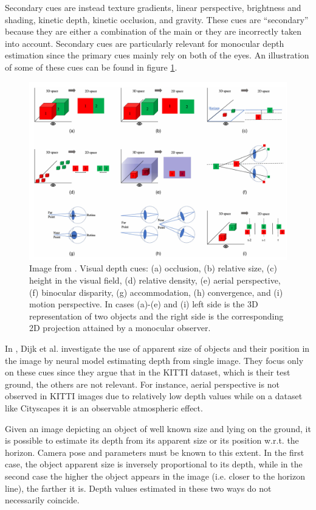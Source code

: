 Secondary cues are instead texture gradients, linear perspective, brightness and shading, kinetic depth, kinetic occlusion, and gravity.
These cues are “secondary” because they are either a combination of the main or they are incorrectly taken into account.
Secondary cues are particularly relevant for monocular depth estimation since the primary cues mainly rely on both of the eyes.
An illustration of some of these cues can be found in figure \ref{fig:cues}.

\begin{figure}
    \centering
    \includegraphics[width=1.\textwidth]{figs/cues}
    \caption{
        Image from \cite{monocular2024}. Visual depth cues: (a) occlusion, (b) relative size, (c) height in the visual field, (d) relative density, (e) aerial perspective, (f) binocular disparity, (g) accommodation, (h) convergence, and (i) motion perspective.
        In cases (a)-(e) and (i) left side is the 3D representation of two objects and the right side is the corresponding 2D projection attained by a monocular observer.
        \label{fig:cues}
    }
\end{figure}

In \cite{Dijk}, Dijk et al. investigate the use of apparent size of objects and their position in the image by neural model estimating depth from single image.
They focus only on these cues since they argue that in the KITTI dataset, which is their test ground, the others are not relevant.
For instance, aerial perspective is not observed in KITTI images due to relatively low depth values while on a dataset like Cityscapes it is an observable atmospheric effect.

Given an image depicting an object of well known size and lying on the ground, it is possible to estimate its depth from its apparent size or its position w.r.t. the horizon.
Camera pose and parameters must be known to this extent.
In the first case, the object apparent size is inversely proportional to its depth, while in the second case the higher the object appears in the image (i.e. closer to the horizon line), the farther it is.
Depth values estimated in these two ways do not necessarily coincide.

